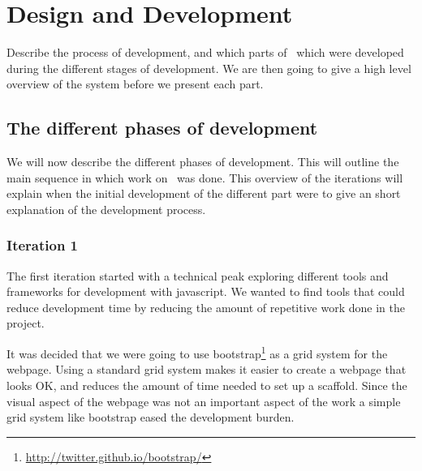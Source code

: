 
\chapter{Design and Development} %

\label{DesignAndDevelopment} %



Describe the process of development,
and which parts of \theartefact\ which were developed during the different stages of development.
We are then going to give a high level overview of the system before we present each part.

\section{The different phases of development}
We will now describe the different phases of development.
This will outline the main sequence in which work on \theartefact\ was done.
This overview of the iterations will explain when the initial development of
the different part were to give an short explanation of the development process.

\subsection{Iteration 1}
The first iteration started with a technical peak exploring different tools and frameworks for development with javascript.
We wanted to find tools that could reduce development time by reducing the amount of repetitive work done in the project.

It was decided that we were going to use bootstrap\footnote{\url{http://twitter.github.io/bootstrap/}} as a grid system
for the webpage.
Using a standard grid system makes it easier to create a webpage that looks OK,
and reduces the amount of time needed to set up a scaffold.
Since the visual aspect of the webpage was not an important aspect of the work a simple grid system like bootstrap
eased the development burden.

